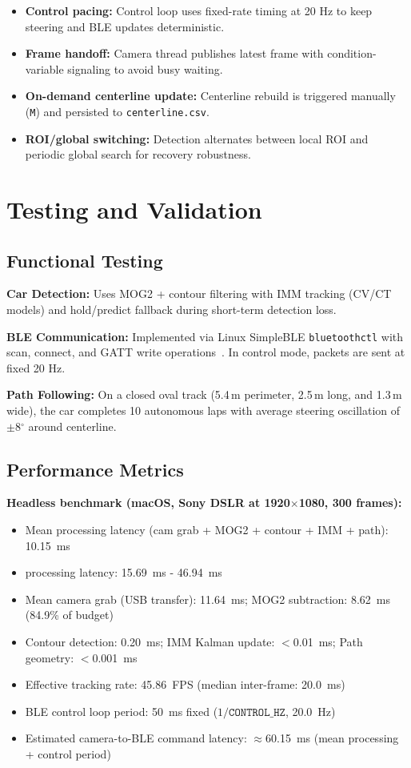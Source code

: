 \documentclass[twocolumn]{article}
\begin{document}
\begin{itemize}
  \item \textbf{Control pacing:} Control loop uses fixed-rate timing at 20 Hz to keep steering and BLE updates deterministic.
  \item \textbf{Frame handoff:} Camera thread publishes latest frame with condition-variable signaling to avoid busy waiting.
  \item \textbf{On-demand centerline update:} Centerline rebuild is triggered manually (\texttt{M}) and persisted to \texttt{centerline.csv}.
  \item \textbf{ROI/global switching:} Detection alternates between local ROI and periodic global search for recovery robustness.
\end{itemize}

\section{Testing and Validation}

\subsection{Functional Testing}

\textbf{Car Detection:} Uses MOG2 + contour filtering with IMM tracking (CV/CT models) and hold/predict fallback during short-term detection loss.

\textbf{BLE Communication:} Implemented via Linux SimpleBLE \texttt{bluetoothctl} with scan, connect, and GATT write operations~\cite{gattspec}. In control mode, packets are sent at fixed 20 Hz.

\textbf{Path Following:} On a closed oval track (5.4\,m perimeter,
2.5\,m long, and 1.3\,m wide), the car completes 10 autonomous laps with average steering oscillation of $\pm$8$^\circ$ around centerline.

\subsection{Performance Metrics}

\textbf{Headless benchmark (macOS, Sony DSLR at 1920$\times$1080, 300 frames):}
\begin{itemize}
  \item Mean processing latency (cam grab + MOG2 + contour + IMM + path): 10.15~ms
  \item processing latency: 15.69~ms - 46.94~ms
  \item Mean camera grab (USB transfer): 11.64~ms; MOG2 subtraction: 8.62~ms (84.9\% of budget)
  \item Contour detection: 0.20~ms; IMM Kalman update: $<$0.01~ms; Path geometry: $<$0.001~ms
  \item Effective tracking rate: 45.86~FPS (median inter-frame: 20.0~ms)
  \item BLE control loop period: 50~ms fixed ($1/\texttt{CONTROL\_HZ}$, 20.0~Hz)
  \item Estimated camera-to-BLE command latency: $\approx$60.15~ms (mean processing + control period)
\end{itemize}
\end{document}
